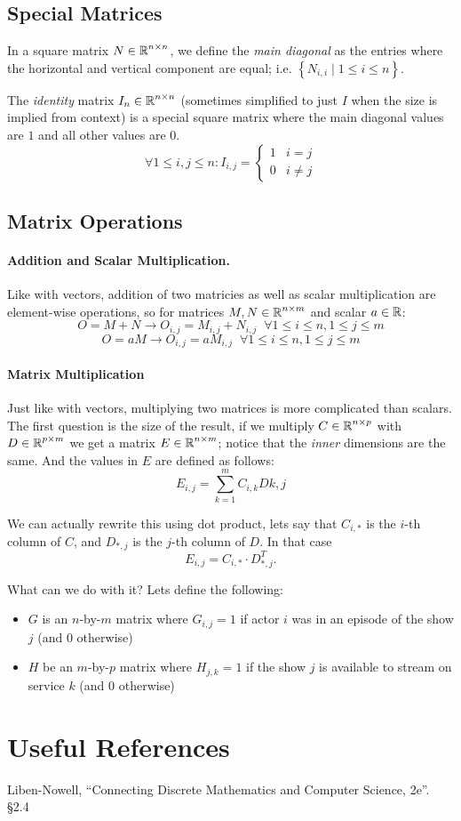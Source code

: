 \subsection{Special Matrices}
In a square matrix $N\in\operatorname{\mathbb{R}}^{n\times n}$, we define the \emph{main diagonal} as the entries where the horizontal and vertical component are equal; 
i.e. $\left\{N_{i,i} \mid 1 \le i \le n\right\}$. 

The \emph{identity} matrix $I_n \in\operatorname{\mathbb{R}}^{n\times n}$ (sometimes simplified to just $I$ when the size is implied from context) 
is a special square matrix where the main diagonal values are $1$ and all other values are $0$.
\[
\forall 1 \le i,j \le n : I_{i,j} = \begin{cases} 1 & i=j\\ 0 & i\ne j\end{cases}
\]
\subsection{Matrix Operations}
\paragraph{Addition and Scalar Multiplication.}
Like with vectors, addition of two matricies as well as scalar multiplication are element-wise operations, so for matrices $M,N \in \operatorname{\mathbb{R}}^{n\times m}$ and scalar $a\in\operatorname{\mathbb{R}}$:
\[O = M+N \rightarrow O_{i,j} = M_{i,j} + N_{i,j} \;\; \forall 1 \le i \le n, 1 \le j \le m\]
\[O = aM \rightarrow O_{i,j} = a M_{i,j} \;\; \forall 1 \le i \le n, 1 \le j \le m\]

\paragraph{Matrix Multiplication}
Just like with vectors, multiplying two matrices is more complicated than scalars. 
The first question is the size of the result, if we multiply $C \in \operatorname{\mathbb{R}}^{n\times p}$ with $D \in \operatorname{\mathbb{R}}^{p\times m}$ we get a matrix $E \in \operatorname{\mathbb{R}}^{n\times m}$;
notice that the \textit{inner} dimensions are the same.
And the values in $E$ are defined as follows:
\[
E_{i,j} = \sum_{k=1}^m C_{i,k}D{k,j}
\]

We can actually rewrite this using dot product, lets say that $C_{i,*}$ is the $i$-th column of $C$, and $D_{*,j}$ is the $j$-th column of $D$.
In that case \[E_{i,j} = C_{i,*}\cdot D_{*,j}^T.\]

What can we do with it? Lets define the following:
\begin{itemize}
\item $G$ is an $n$-by-$m$ matrix where $G_{i,j}=1$ if actor $i$ was in an episode of the show $j$ (and $0$ otherwise)
\item $H$ be an $m$-by-$p$ matrix where $H_{j,k}=1$ if the show $j$ is available to stream on service $k$ (and $0$ otherwise) 
\end{itemize}


\section*{Useful References}
Liben-Nowell, ``Connecting Discrete Mathematics and Computer Science, 2e''. \S 2.4

